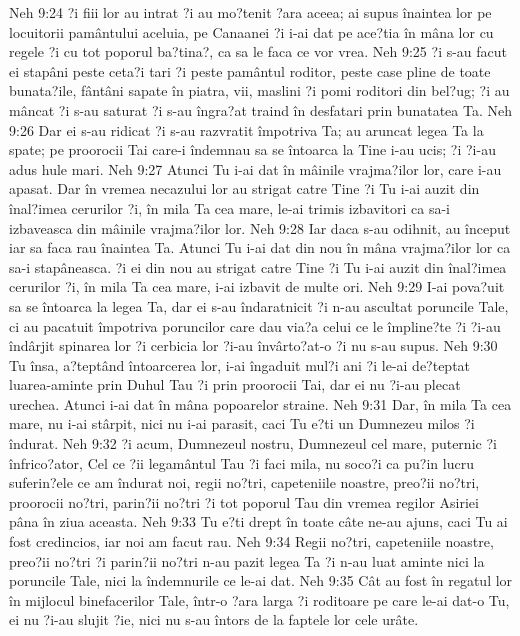 Neh 9:24  ?i fiii lor au intrat ?i au mo?tenit ?ara aceea; ai supus înaintea lor pe locuitorii pamântului aceluia, pe Canaanei ?i i-ai dat pe ace?tia în mâna lor cu regele ?i cu tot poporul ba?tina?, ca sa le faca ce vor vrea.
Neh 9:25  ?i s-au facut ei stapâni peste ceta?i tari ?i peste pamântul roditor, peste case pline de toate bunata?ile, fântâni sapate în piatra, vii, maslini ?i pomi roditori din bel?ug; ?i au mâncat ?i s-au saturat ?i s-au îngra?at traind în desfatari prin bunatatea Ta.
Neh 9:26  Dar ei s-au ridicat ?i s-au razvratit împotriva Ta; au aruncat legea Ta la spate; pe proorocii Tai care-i îndemnau sa se întoarca la Tine i-au ucis; ?i ?i-au adus hule mari.
Neh 9:27  Atunci Tu i-ai dat în mâinile vrajma?ilor lor, care i-au apasat. Dar în vremea necazului lor au strigat catre Tine ?i Tu i-ai auzit din înal?imea cerurilor ?i, în mila Ta cea mare, le-ai trimis izbavitori ca sa-i izbaveasca din mâinile vrajma?ilor lor.
Neh 9:28  Iar daca s-au odihnit, au început iar sa faca rau înaintea Ta. Atunci Tu i-ai dat din nou în mâna vrajma?ilor lor ca sa-i stapâneasca. ?i ei din nou au strigat catre Tine ?i Tu i-ai auzit din înal?imea cerurilor ?i, în mila Ta cea mare, i-ai izbavit de multe ori.
Neh 9:29  I-ai pova?uit sa se întoarca la legea Ta, dar ei s-au îndaratnicit ?i n-au ascultat poruncile Tale, ci au pacatuit împotriva poruncilor care dau via?a celui ce le împline?te ?i ?i-au îndârjit spinarea lor ?i cerbicia lor ?i-au învârto?at-o ?i nu s-au supus.
Neh 9:30  Tu însa, a?teptând întoarcerea lor, i-ai îngaduit mul?i ani ?i le-ai de?teptat luarea-aminte prin Duhul Tau ?i prin proorocii Tai, dar ei nu ?i-au plecat urechea. Atunci i-ai dat în mâna popoarelor straine.
Neh 9:31  Dar, în mila Ta cea mare, nu i-ai stârpit, nici nu i-ai parasit, caci Tu e?ti un Dumnezeu milos ?i îndurat.
Neh 9:32  ?i acum, Dumnezeul nostru, Dumnezeul cel mare, puternic ?i înfrico?ator, Cel ce ?ii legamântul Tau ?i faci mila, nu soco?i ca pu?in lucru suferin?ele ce am îndurat noi, regii no?tri, capeteniile noastre, preo?ii no?tri, proorocii no?tri, parin?ii no?tri ?i tot poporul Tau din vremea regilor Asiriei pâna în ziua aceasta.
Neh 9:33  Tu e?ti drept în toate câte ne-au ajuns, caci Tu ai fost credincios, iar noi am facut rau.
Neh 9:34  Regii no?tri, capeteniile noastre, preo?ii no?tri ?i parin?ii no?tri n-au pazit legea Ta ?i n-au luat aminte nici la poruncile Tale, nici la îndemnurile ce le-ai dat.
Neh 9:35  Cât au fost în regatul lor în mijlocul binefacerilor Tale, într-o ?ara larga ?i roditoare pe care le-ai dat-o Tu, ei nu ?i-au slujit ?ie, nici nu s-au întors de la faptele lor cele urâte.
